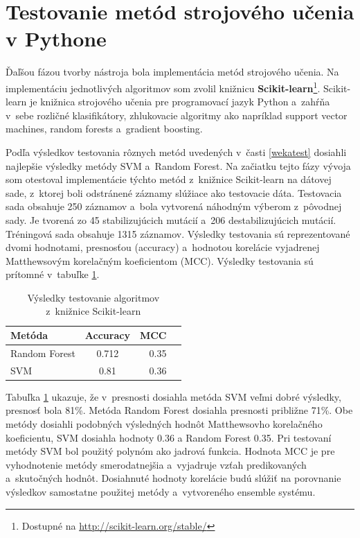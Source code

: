 \section{Testovanie metód strojového učenia v Pythone}

Ďaľšou fázou tvorby nástroja bola implementácia metód strojového učenia. Na implementáciu jednotlivých algoritmov som zvolil knižnicu \textbf{Scikit-learn}\footnote{Dostupné na \url{http://scikit-learn.org/stable/}}. Scikit-learn je knižnica strojového učenia pre programovací jazyk Python a~zahŕňa v~sebe rozličné klasifikátory, zhlukovacie algoritmy ako napríklad support vector machines, random forests a~gradient boosting.

Podľa výsledkov testovania rôznych metód uvedených v~časti \ref{wekatest} dosiahli najlepšie výsledky metódy SVM a~Random Forest. Na začiatku tejto fázy vývoja som otestoval implementácie týchto metód z~knižnice Scikit-learn na dátovej sade, z~ktorej boli odstránené záznamy slúžiace ako testovacie dáta. Testovacia sada obsahuje 250 záznamov a~bola vytvorená náhodným výberom z~pôvodnej sady. Je tvorená zo 45 stabilizujúcich mutácií a~206 destabilizujúcich mutácií. Tréningová sada obsahuje 1315 záznamov. Výsledky testovania sú reprezentované dvomi hodnotami, presnosťou (accuracy) a~hodnotou korelácie vyjadrenej Matthewsovým korelačným koeficientom (MCC). Výsledky testovania sú prítomné v~tabuľke \ref{scikittest}.
\begin{table}[H]
	\centering
	\begin{tabular}{ | l | c | r | l| }
		\hline 
		Metóda  & Accuracy & MCC \\ \hline
		Random Forest & 0.712 & 0.35\\ \hline
		SVM & 0.81 & 0.36 \\\hline
	\end{tabular}
	\caption {Výsledky testovanie algoritmov z~knižnice Scikit-learn} \label{scikittest} 
\end{table}

Tabuľka \ref{scikittest} ukazuje, že v~presnosti dosiahla metóda SVM veľmi dobré výsledky, presnosť bola 81\%. Metóda Random Forest dosiahla presnosti približne 71\%. Obe metódy dosiahli podobných výsledných hodnôt Matthewsovho korelačného koeficientu, SVM dosiahla hodnoty 0.36 a Random Forest 0.35. Pri testovaní metódy SVM bol použitý polynóm ako jadrová funkcia. Hodnota MCC je pre vyhodnotenie metódy smerodatnejšia a~vyjadruje vzťah predikovaných a~skutočných hodnôt. Dosiahnuté hodnoty korelácie budú slúžiť na porovnanie výsledkov samostatne použitej metódy a~vytvoreného ensemble systému.

